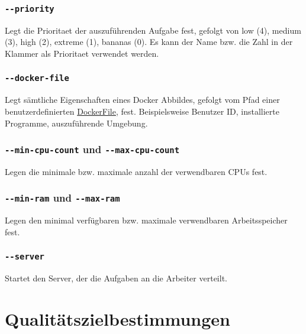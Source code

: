 \documentclass[a4paper,12pt]{article}
\begin{document}
\subsubsection{\texttt{-{}-priority}}
Legt die \gls{Prioritaet} der auszuführenden Aufgabe fest, gefolgt von low (4), medium (3), high (2), extreme (1), bananas (0).
Es kann der Name bzw. die Zahl in der Klammer als \gls{Prioritaet} verwendet werden.

\subsubsection{\texttt{-{}-docker-file}}
Legt sämtliche Eigenschaften eines Docker Abbildes, gefolgt vom Pfad einer benutzerdefinierten \href{https://docs.docker.com/engine/reference/builder/}{DockerFile}, fest.
Beispielsweise Benutzer ID, installierte Programme, auszuführende Umgebung.

\subsubsection{\texttt{-{}-min-cpu-count} und \texttt{-{}-max-cpu-count}}
Legen die minimale bzw. maximale anzahl der verwendbaren \glspl{CPU} fest.

\subsubsection{\texttt{-{}-min-ram} und \texttt{-{}-max-ram}}
Legen den minimal verfügbaren bzw. maximale verwendbaren Arbeitsspeicher fest.

\subsubsection{\texttt{-{}-server}}
Startet den Server, der die Aufgaben an die Arbeiter verteilt.

\section{Qualitätszielbestimmungen}

\begin{comment}

\begin{minipage}[t]{\linewidth}
\item[FA00] \textbf{<Titel>}
\subitem \textbf{Erklärung} <Was soll getestet werden>
\subitem \textbf{Ablauf} <Vorbedingung/Startzustand>
<Eine Sequenz von Aktionen und Zwischenzuständen>
<Nachbedingung/Endzustand>
<Alle Zustände können auch wegfallen>
\end{minipage}
\pagebreak

\end{comment}
\end{document}
